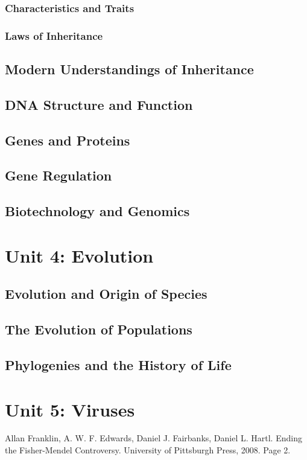 \documentclass[12pt]{article}
\begin{document}
\subsubsection{Characteristics and Traits}
\subsubsection{Laws of Inheritance}

\subsection{Modern Understandings of Inheritance}
\subsection{DNA Structure and Function}
\subsection{Genes and Proteins}
\subsection{Gene Regulation}
\subsection{Biotechnology and Genomics}

\section{Unit 4: Evolution}
\subsection{Evolution and Origin of Species}
\subsection{The Evolution of Populations}
\subsection{Phylogenies and the History of Life}

\section{Unit 5: Viruses}

\begin{thebibliography}{00}
     Allan Franklin, A. W. F. Edwards, Daniel J. Fairbanks, Daniel L. Hartl. Ending the Fisher-Mendel Controversy. University of Pittsburgh Press, 2008. Page 2.
\end{thebibliography}
\end{document}
